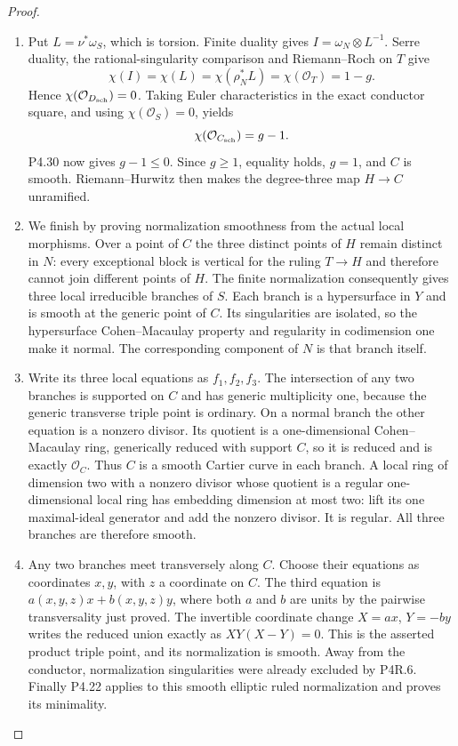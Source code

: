 \begin{proof}
\begin{enumerate}[label={$\langle1\rangle$\arabic*.},leftmargin=*]
\item Put $L=\nu^*\omega_S$, which is torsion. Finite duality
gives $I=\omega_N\otimes L^{-1}$. Serre duality, the
rational-singularity comparison and Riemann--Roch on
$T$ give
\[
 \chi(I)=\chi(L)=\chi(\rho_N^*L)
   =\chi(\mathcal O_T)=1-g.
\]
Hence $\chi(\mathcal O_{D_{\rm sch}})=0$.
Taking Euler characteristics in the exact conductor
square, and using $\chi(\mathcal O_S)=0$, yields
\[
 \chi(\mathcal O_{C_{\rm sch}})=g-1.
\]
P4.30 now gives $g-1\le0$. Since $g\ge1$, equality
holds, $g=1$, and $C$ is smooth. Riemann--Hurwitz then
makes the degree-three map $H\to C$ unramified.

\item We finish by proving normalization smoothness from
the actual local morphisms. Over a point of $C$ the
three distinct points of $H$ remain distinct in $N$:
every exceptional block is vertical for the ruling
$T\to H$ and therefore cannot join different points
of $H$. The finite normalization consequently gives
three local irreducible branches of $S$. Each branch
is a hypersurface in $Y$ and is smooth at the generic
point of $C$. Its singularities are isolated, so the
hypersurface Cohen--Macaulay property and regularity
in codimension one make it normal. The corresponding
component of $N$ is that branch itself.

\item Write its three local equations as $f_1,f_2,f_3$.
The intersection of any two branches is supported on
$C$ and has generic multiplicity one, because the
generic transverse triple point is ordinary. On a
normal branch the other equation is a nonzero divisor.
Its quotient is a one-dimensional Cohen--Macaulay
ring, generically reduced with support $C$, so it is
reduced and is exactly $\mathcal O_C$. Thus $C$ is a
smooth Cartier curve in each branch. A local ring of
dimension two with a nonzero divisor whose quotient
is a regular one-dimensional local ring has embedding
dimension at most two: lift its one maximal-ideal
generator and add the nonzero divisor. It is regular.
All three branches are therefore smooth.

\item Any two branches meet transversely along $C$.
Choose their equations as coordinates $x,y$, with
$z$ a coordinate on $C$. The third equation is
$a(x,y,z)x+b(x,y,z)y$, where both $a$ and $b$ are
units by the pairwise transversality just proved.
The invertible coordinate change $X=ax$, $Y=-by$
writes the reduced union exactly as
$XY(X-Y)=0$. This is the asserted product triple
point, and its normalization is smooth. Away from
the conductor, normalization singularities were
already excluded by P4R.6. Finally P4.22 applies to
this smooth elliptic ruled normalization and proves
its minimality.

\end{enumerate}
\end{proof}
